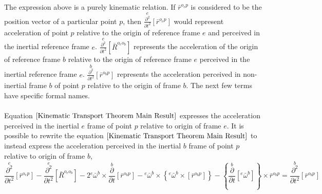 The expression above is a purely kinematic relation. 
If $\displaystyle \bar{r}^{o_{e}p}$ is considered to be the position vector of a particular point $p$, then $\displaystyle \overset{e}{\frac{\partial^{2}}{\partial t^{2}}}[\bar{r}^{o_{e}p}]$ would represent acceleration of point $p$ relative to the origin of reference frame $e$ and perceived in the inertial reference frame $e$. 
$\displaystyle \overset{e}{\frac{\partial^{2}}{\partial t^{2}}}[\bar{R}^{o_{e}o_{b}}]$ represents the acceleration of the origin of reference frame $b$ relative to the origin of reference frame $e$ perceived in the inertial reference frame $e$. 
$\displaystyle \overset{b}{\frac{\partial^{2}}{\partial t^{2}}}[\bar{r}^{o_{b}p}]$ represents the acceleration perceived in non-inertial frame $b$ of point $p$ relative to the origin of frame $b$. 
The next few terms have specific formal names.
\\~\\Equation $\ref{Kinematic Transport Theorem Main Result}$ expresses the acceleration perceived in the inertial $e$ frame of point $p$ relative to origin of frame $e$. 
It is possible to rewrite the equation $\ref{Kinematic Transport Theorem Main Result}$ to instead express the acceleration perceived in the inertial $b$ frame of point $p$ relative to origin of frame $b$,
\begin{equation}\overset{e}{\frac{\partial^{2}}{\partial t^{2}}}[\bar{r}^{o_{e}p}]  -  \overset{e}{\frac{\partial^{2}}{\partial t^{2}}}[\bar{R}^{o_{e}o_{b}}]  -  2{}^{e}\bar{\omega}^{b}\times\overset{b}{\frac{\partial}{\partial t}}[\bar{r}^{o_{b}p}]    -   {}^{e}\bar{\omega}^{b}\times\left\{{}^{e}\bar{\omega}^{b}\times\left[\bar{r}^{o_{b}p}\right]\right\}  -    \left\{\overset{b}{\frac{\partial}{\partial t}}[{}^{e}\bar{\omega}^{b}]\right\}\times\bar{r}^{o_{b}p} =  \overset{b}{\frac{\partial^{2}}{\partial t^{2}}}[\bar{r}^{o_{b}p}]    \label{esidisi2}\end{equation}
